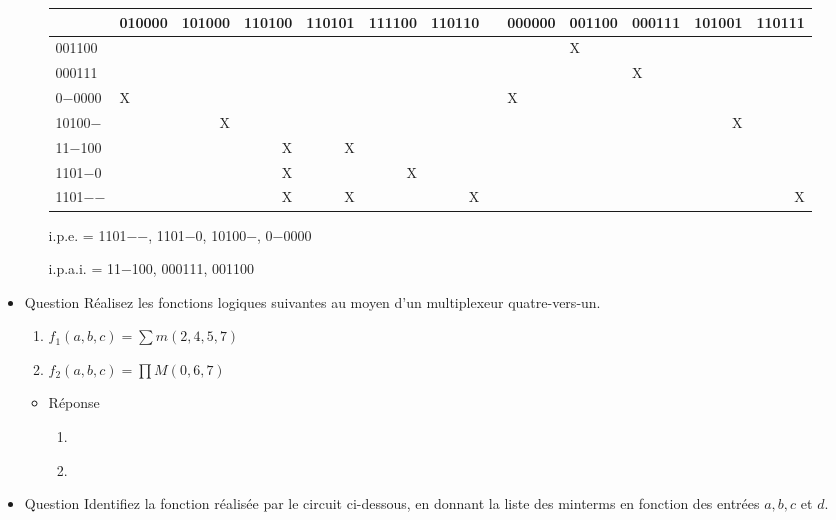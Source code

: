 \documentclass[letter, oneside]{book}
\begin{document}
\begin{itemize}
\begin{itemize}
{\begin{center}
\begin{tabular}{llrrrrrllllrr}
 & 010000 & 101000 & 110100 & 110101 & 111100 & 110110 &  & 000000 & 001100 & 000111 & 101001 & 110111\\[0pt]
\hline
001100 &  &  &  &  &  &  &  &  & X &  &  & \\[0pt]
000111 &  &  &  &  &  &  &  &  &  & X &  & \\[0pt]
0−0000 & X &  &  &  &  &  &  & X &  &  &  & \\[0pt]
10100− &  & X &  &  &  &  &  &  &  &  & X & \\[0pt]
11−100 &  &  & X & X &  &  &  &  &  &  &  & \\[0pt]
1101−0 &  &  & X &  & X &  &  &  &  &  &  & \\[0pt]
1101−− &  &  & X & X &  & X &  &  &  &  &  & X\\[0pt]
\end{tabular}
\end{center}
}
i.p.e.   = 1101−−, 1101−0, 10100−, 0−0000

i.p.a.i. = 11−100, 000111, 001100
\end{itemize}

\item Question
\label{sec:orgf3690b7}
Réalisez les fonctions logiques suivantes au moyen d'un multiplexeur
quatre-vers-un.

\begin{enumerate}
\item \(f_1(a,b,c) = \sum m(2, 4, 5, 7)\)

\item \(f_2(a,b,c) = \prod M(0, 6, 7)\)
\end{enumerate}

\begin{itemize}
\item Réponse
\label{sec:org4625ed9}
\begin{enumerate}
\item \begin{center}

\end{center}

\item \begin{center}

\end{center}
\end{enumerate}
\end{itemize}

\item Question
\label{sec:org84cd10b}
Identifiez la fonction réalisée par le circuit ci-dessous, en donnant
la liste des minterms en fonction des entrées \(a, b, c\) et \(d\).


\end{itemize}
\end{document}
